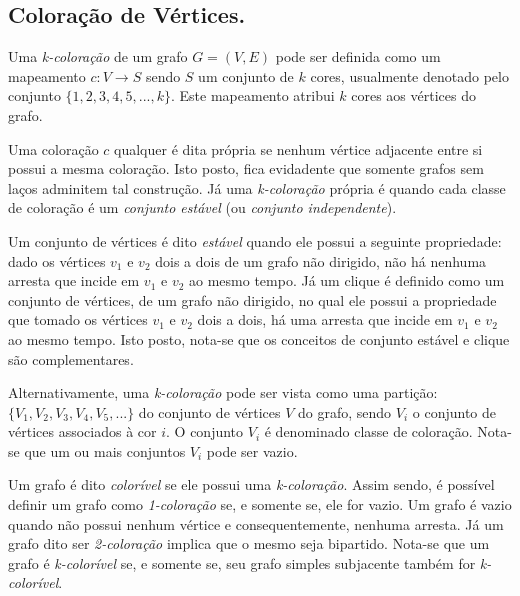 \documentclass[12pt]{article}
\begin{document}

\subsection{Coloração de Vértices.}

Uma \emph{k-coloração} de um grafo $G =(V, E)$ pode ser definida como um mapeamento $c: V \rightarrow S$ sendo $S$ um conjunto de $k$ cores, usualmente denotado pelo conjunto $\{1, 2, 3, 4, 5, ..., k\}$. Este mapeamento atribui $k$ cores aos vértices do grafo.

Uma coloração $c$ qualquer é dita própria se nenhum vértice adjacente entre si possui a mesma coloração. Isto posto, fica evidadente que somente grafos sem laços adminitem tal construção. Já uma \emph{k-coloração} própria é quando cada classe de coloração é um \emph{conjunto estável} (ou \emph{conjunto independente}).

Um conjunto de vértices é dito \emph{estável} quando ele possui a seguinte propriedade: dado os vértices $v_1$ e $v_2$ dois a dois de um grafo não dirigido, não há nenhuma arresta que incide em $v_1$ e $v_2$ ao mesmo tempo. Já um clique é definido como um conjunto de vértices, de um grafo não dirigido, no qual ele possui a propriedade que tomado os vértices $v_1$ e $v_2$ dois a dois, há uma arresta que incide em $v_1$ e $v_2$ ao mesmo tempo. Isto posto, nota-se que os conceitos de conjunto estável e clique são complementares.

Alternativamente, uma \emph{k-coloração} pode ser vista como uma partição: $\{V_1, V_2, V_3, V_4, V_5, ...\}$ do conjunto de vértices $V$ do grafo, sendo $V_i$ o conjunto de vértices associados à cor $i$. O conjunto $V_i$ é denominado classe de coloração. Nota-se que um ou mais conjuntos $V_i$ pode ser vazio.

Um grafo é dito \emph{colorível} se ele possui uma \emph{k-coloração}. Assim sendo, é possível definir um grafo como \emph{1-coloração} se, e somente se, ele for vazio. Um grafo é vazio quando não possui nenhum vértice e consequentemente, nenhuma arresta. Já um grafo dito ser \emph{2-coloração} implica que o mesmo seja bipartido. Nota-se que um grafo é \emph{k-colorível} se, e somente se, seu grafo simples subjacente também for \emph{k-colorível}.
\end{document}
